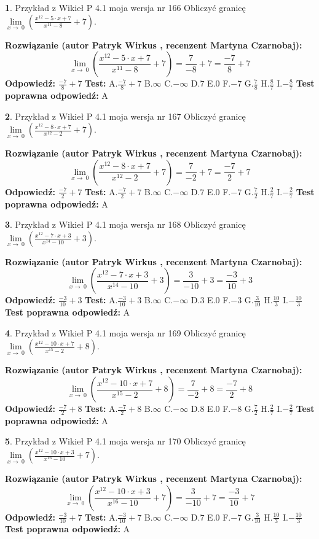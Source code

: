 \documentclass[12pt, a4paper]{article}
\theoremstyle{definition} %
\newtheorem{zad}{}
\newcommand{\zadStart}[1]{\begin{zad}#1\newline}
\newcommand{\zadStop}{\end{zad}}
\newcommand{\rozwStart}[2]{\noindent \textbf{Rozwiązanie (autor #1 , recenzent #2): }\newline}
\newcommand{\rozwStop}{\newline}
\newcommand{\odpStart}{\noindent \textbf{Odpowiedź:}\newline}
\newcommand{\odpStop}{\newline}
\newcommand{\testStart}{\noindent \textbf{Test:}\newline}
\newcommand{\testStop}{\newline}
\newcommand{\kluczStart}{\noindent \textbf{Test poprawna odpowiedź:}\newline}
\newcommand{\kluczStop}{\newline}
\begin{document}
\zadStart{Przykład z Wikieł P 4.1 moja wersja nr 166}
Obliczyć granicę $\lim\limits_{x\to\ 0}(\frac{x^{12}-5 \cdot x +7}{x^{11}-8}+7)$.
\zadStop
\rozwStart{Patryk Wirkus}{Martyna Czarnobaj}
$$\lim\limits_{x\to\ 0}(\frac{x^{12}-5 \cdot x +7}{x^{11}-8}+7)=\frac{7}{-8}+7=\frac{-7}{8}+7$$
\rozwStop
\odpStart
$\frac{-7}{8}+7$
\odpStop
\testStart
A.$\frac{-7}{8}+7$
B.$\infty$
C.$-\infty$
D.$7$
E.$0$
F.$-7$
G.$\frac{7}{8}$
H.$\frac{8}{7}$
I.$-\frac{8}{7}$
\testStop
\kluczStart
A
\kluczStop



\zadStart{Przykład z Wikieł P 4.1 moja wersja nr 167}
Obliczyć granicę $\lim\limits_{x\to\ 0}(\frac{x^{12}-8 \cdot x +7}{x^{12}-2}+7)$.
\zadStop
\rozwStart{Patryk Wirkus}{Martyna Czarnobaj}
$$\lim\limits_{x\to\ 0}(\frac{x^{12}-8 \cdot x +7}{x^{12}-2}+7)=\frac{7}{-2}+7=\frac{-7}{2}+7$$
\rozwStop
\odpStart
$\frac{-7}{2}+7$
\odpStop
\testStart
A.$\frac{-7}{2}+7$
B.$\infty$
C.$-\infty$
D.$7$
E.$0$
F.$-7$
G.$\frac{7}{2}$
H.$\frac{2}{7}$
I.$-\frac{2}{7}$
\testStop
\kluczStart
A
\kluczStop



\zadStart{Przykład z Wikieł P 4.1 moja wersja nr 168}
Obliczyć granicę $\lim\limits_{x\to\ 0}(\frac{x^{12}-7 \cdot x +3}{x^{14}-10}+3)$.
\zadStop
\rozwStart{Patryk Wirkus}{Martyna Czarnobaj}
$$\lim\limits_{x\to\ 0}(\frac{x^{12}-7 \cdot x +3}{x^{14}-10}+3)=\frac{3}{-10}+3=\frac{-3}{10}+3$$
\rozwStop
\odpStart
$\frac{-3}{10}+3$
\odpStop
\testStart
A.$\frac{-3}{10}+3$
B.$\infty$
C.$-\infty$
D.$3$
E.$0$
F.$-3$
G.$\frac{3}{10}$
H.$\frac{10}{3}$
I.$-\frac{10}{3}$
\testStop
\kluczStart
A
\kluczStop



\zadStart{Przykład z Wikieł P 4.1 moja wersja nr 169}
Obliczyć granicę $\lim\limits_{x\to\ 0}(\frac{x^{12}-10 \cdot x +7}{x^{15}-2}+8)$.
\zadStop
\rozwStart{Patryk Wirkus}{Martyna Czarnobaj}
$$\lim\limits_{x\to\ 0}(\frac{x^{12}-10 \cdot x +7}{x^{15}-2}+8)=\frac{7}{-2}+8=\frac{-7}{2}+8$$
\rozwStop
\odpStart
$\frac{-7}{2}+8$
\odpStop
\testStart
A.$\frac{-7}{2}+8$
B.$\infty$
C.$-\infty$
D.$8$
E.$0$
F.$-8$
G.$\frac{7}{2}$
H.$\frac{2}{7}$
I.$-\frac{2}{7}$
\testStop
\kluczStart
A
\kluczStop



\zadStart{Przykład z Wikieł P 4.1 moja wersja nr 170}
Obliczyć granicę $\lim\limits_{x\to\ 0}(\frac{x^{12}-10 \cdot x +3}{x^{16}-10}+7)$.
\zadStop
\rozwStart{Patryk Wirkus}{Martyna Czarnobaj}
$$\lim\limits_{x\to\ 0}(\frac{x^{12}-10 \cdot x +3}{x^{16}-10}+7)=\frac{3}{-10}+7=\frac{-3}{10}+7$$
\rozwStop
\odpStart
$\frac{-3}{10}+7$
\odpStop
\testStart
A.$\frac{-3}{10}+7$
B.$\infty$
C.$-\infty$
D.$7$
E.$0$
F.$-7$
G.$\frac{3}{10}$
H.$\frac{10}{3}$
I.$-\frac{10}{3}$
\testStop
\kluczStart
A
\kluczStop
\end{document}
